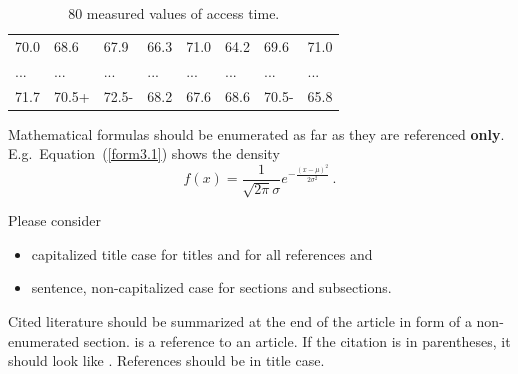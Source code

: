 \documentclass[article]{ajs}
\begin{document}
\begin{table}[hbt]
\caption{\label{Tab3.4}80 measured values of access time.}
\vspace*{-5mm}
\small
\hspace{1.5cm}
\begin{center}
\begin{tabular}{|llllllll|}
\toprule
70.0 & 68.6 & 67.9 & 66.3 & 71.0 & 64.2 & 69.6 & 71.0\\
... & ... & ... & ... & ... & ... & ... & ...\\
71.7 & 70.5+& 72.5-& 68.2 & 67.6 & 68.6 & 70.5-& 65.8\\
\bottomrule
\end{tabular}
\end{center}
\end{table}

Mathematical formulas should be enumerated as far as they are
referenced \textbf{only}. E.g.~Equation~(\ref{form3.1}) shows the density 
\begin{equation}\label{form3.1}
f(x) =
\frac1{\sqrt{2\pi}\sigma}e^{-\frac{(x-\mu)^2}{2\sigma^2}}\,.
\end{equation}

Please consider 

\begin{itemize}
\item  capitalized title case for titles and for all references and 
\item sentence, non-capitalized case for sections and subsections.
\end{itemize}


Cited literature should be summarized at the end of the article in
form of a non-enumerated section. \cite{leisch02} is a reference
to an article. If the citation is in parentheses, it
should look like \citep{leisch02}.
References should be in title case.
\end{document}
